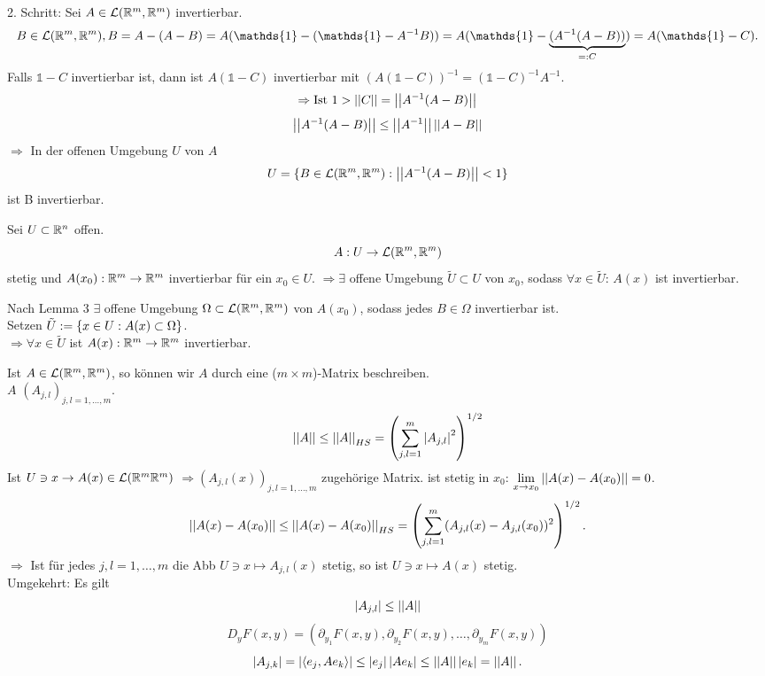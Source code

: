 \documentclass[../ana2.tex]{subfiles}
\begin{document}
\begin{bew}
    2. Schritt: Sei \( A \in \mathcal{L}(\mathbb{R}^m, \mathbb{R}^m) \) invertierbar.\\
    \[ B \in \mathcal{L}(\R^m, \R^m), B = A - (A - B) 
    = A (\mathds{1} - (\mathds{1} - A^{-1}B)) 
    = A (\mathds{1}- \underbrace{(A^{-1}(A-B))}_{=: C})
    = A(\mathds{1} - C). \]
    Falls \( \mathds{1} - C \) invertierbar ist, dann ist 
    \( A(\mathds{1} - C) \) invertierbar mit 
    \( (A(\mathds{1} - C))^{-1} = (\mathds{1} - C)^{-1} A^{-1} \).
    \[\Rightarrow \text{Ist } 1 > \left|\left|C\right|\right| = \left|\left|A^{-1}(A-B)\right|\right|\] 
    \[ \left|\left| A^{-1} (A - B) \right|\right| \leq \left|\left|A^{-1}\right|\right| \left|\left|A - B\right|\right| \]
    \( \Rightarrow \) In der offenen Umgebung \( U \) von \(A\)
    \[ U = \{ B \in \mathcal{L}(\mathbb{R}^m, \mathbb{R}^m) : \left|\left| A^{-1} (A - B) \right|\right| < 1 \} \] 
    ist B invertierbar.
\end{bew}
\begin{kor}
    Sei \( U \subset \mathbb{R}^n \) offen. 
    \[ A:U\rightarrow \mathcal{L}(\mathbb{R}^m, \mathbb{R}^m) \]
    stetig und \( A(x_0):\mathbb{R}^m\rightarrow \mathbb{R}^m \) invertierbar 
    für ein \( x_0 \in U \). \( \Rightarrow \exists \) offene Umgebung 
    \( \tilde{U} \subset U \) von \( x_0 \), sodass \( \forall x \in \tilde{U} \): 
    \( A(x) \) ist invertierbar.
\end{kor}
\begin{bew}
    Nach Lemma 3 \( \exists \) offene Umgebung 
    \( \Omega \subset \mathcal{L}(\mathbb{R}^m, \mathbb{R}^m) \) 
    von \( A(x_0) \), sodass jedes \( B \in \Omega \) invertierbar ist.\\
    Setzen \( \tilde{U} := \{x \in U: A(x) \subset \Omega\} \).\\
    \( \Rightarrow \forall x \in \tilde{U}\) ist \(A(x):\mathbb{R}^m\rightarrow \mathbb{R}^m\) invertierbar.
\end{bew}
\begin{bem}
    Ist \( A \in \mathcal{L}(\mathbb{R}^m, \mathbb{R}^m) \), so können wir 
    \( A \) durch eine (\(m \times m\))-Matrix beschreiben.\\
    \( A \) \gqq{\(=\)} \( (A_{j,l})_{j,l = 1,\ldots,m} \).
    \[ \left|\left|A\right|\right| \leq \left|\left|A\right|\right|_{HS} 
    = \left( \sum_{j,l = 1}^m \left|A_{j,l}\right|^2 \right)^{1/2} \]
    Ist \(U\ni x \rightarrow A(x) \in \mathcal{L}(\mathbb{R}^m \mathbb{R}^m)\)
    \(\Rightarrow (A_{j,l}(x))_{j,l=1,\ldots,m}\) zugehörige Matrix.
    ist stetig in \( x_0 \): \( \lim\limits_{x\rightarrow{}x_0} \left|\left|A(x) - A(x_0)\right|\right| = 0 \).\\
    \[ \left|\left| A(x) - A(x_0) \right|\right|\leq \left|\left| A(x) - A(x_0) \right|\right|_{HS}
    = \left( \sum_{j,l=1}^m (A_{j,l}(x) - A_{j,l}(x_0))^2 \right)^{1/2}. \]
    \( \Rightarrow \) Ist für jedes \(j, l = 1,\ldots,m\) die Abb 
    \(U \ni x \mapsto A_{j,l}(x)\) stetig,
    so ist \( U \ni x \mapsto A(x) \) stetig.\\
    Umgekehrt: Es gilt 
    \[ \left| A_{j,l} \right| \leq \left|\left|A\right|\right| \]
    \[D_y F(x,y) = (\partial_{y_1} F(x,y), \partial_{y_2} F(x,y), \ldots, 
    \partial_{y_m} F(x, y)) \]
    \[ \left|A_{j,k}\right| 
    = \left| \langle e_j, A e_k \rangle \right| 
    \leq \left|e_j\right| \left|A e_k\right| 
    \leq \left|\left|A\right|\right| \left|e_k\right| = \left|\left|A\right|\right|. \]
\end{bem}
\end{document}
